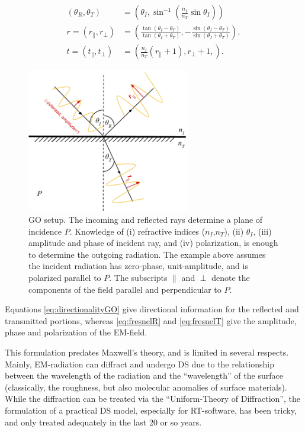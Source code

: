 \documentclass[lettersize,journal]{IEEEtran}
\begin{document}
\begin{subequations}\label{eq:GO}
	\begin{align}
		\left( \theta_R, \theta_T \right) &= \left( \theta_I,  \sin^{-1} \left( \frac{n_I}{n_T}\sin\theta_I \right) \right) \label{eq:directionalityGO} \\
		r =(r_{\parallel}, r_{\perp}) &= \left( \frac{\tan(\theta_I - \theta_T)}{\tan(\theta_I+\theta_T)}, -\frac{\sin(\theta_I - \theta_T)}{\sin(\theta_I+\theta_T)} \right), \label{eq:fresnelR} \\
		t = (t_{\parallel},t_{\perp}) &= \left( \frac{n_I}{n_T}(r_{\parallel} + 1), r_{\perp} + 1, \right). \label{eq:fresnelT}
	\end{align}
\end{subequations}
\begin{figure}[t]
	\centering
	\includegraphics[width=2.8in]{GO Setup}
	\captionsetup{singlelinecheck=off}
		\caption[]{GO setup. The incoming and reflected rays determine a plane of incidence $P$. Knowledge of (i) refractive indices ($n_I$,$n_T$), (ii) $\theta_I$, (iii) amplitude and phase of incident ray, and (iv) polarization, is enough to determine the outgoing radiation. The example above assumes the incident radiation has zero-phase, unit-amplitude, and is polarized parallel to $P$. The subscripts $\parallel$ and $\perp$ denote the components of the field parallel and perpendicular to $P$.
	} 
	\label{diag:GOSetup}
\end{figure}
Equations \eqref{eq:directionalityGO} give directional information for the reflected and transmitted portions, whereas \eqref{eq:fresnelR} and \eqref{eq:fresnelT} give the amplitude, phase and polarization of the EM-field.

This formulation predates Maxwell's theory, and is limited in several respects. Mainly, EM-radiation can diffract and undergo DS due to the relationship between the wavelength of the radiation and the ``wavelength'' of the surface (classically, the roughness, but also molecular anomalies of surface materials). While the diffraction can be treated via the ``Uniform-Theory of Diffraction'', the formulation of a practical DS model, especially for RT-software, has been tricky, and only treated adequately in the last 20 or so years. 
\end{document}
